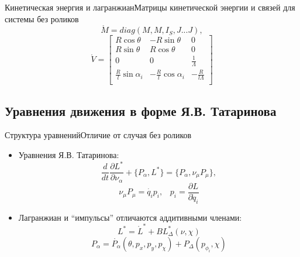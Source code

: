\documentclass{beamer}
\begin{document}
\begin{frame}{Кинетическая энергия и лагранжиан}{Матрицы кинетической энергии и связей для системы без роликов}
    $$ \mathring{M} = diag(M, M, I_S, J...J), $$
    $$ \mathring{V} = \begin{bmatrix}
        R\cos\theta & -R\sin\theta & 0 \\
        R\sin\theta & R\cos\theta  & 0 \\
        0           & 0            & \frac{1}{\Lambda} \\
        \frac{R}{l}\sin\alpha_i & -\frac{R}{l}\cos\alpha_i & -\frac{R}{l\Lambda} \\
    \end{bmatrix} $$
\end{frame}

\subsection{Уравнения движения в форме Я.В. Татаринова}

\begin{frame}{Структура уравнений}{Отличие от случая без роликов}
  \begin{itemize}
  \item {
    Уравнения Я.В. Татаринова:
    \begin{equation}\label{Tatarinov}
    \frac{d}{dt}\frac{\partial L^{*}}{\partial \nu_\alpha}  + \{P_\alpha, L^{*}\} = \{P_\alpha, \nu_\mu P_\mu\},
    \end{equation}
    $$ \nu_\mu P_\mu = \dot{q_i} p_i, \hspace{10pt} p_i = \frac{\partial L}{\partial \dot{q}_i} $$
  }
  \item {
    Лагранжиан и ``импульсы'' отличаются аддитивными членами:
    $$ L^{*} = \mathring{L}^{*} + BL^{*}_\Delta(\nu, \chi) $$
    $$ P_\alpha = \mathring{P_\alpha}(\theta, p_x, p_y, p_\chi) + P_\Delta(p_{\phi_i}, \chi) $$
  }

  \end{itemize}
\end{frame}
\end{document}
